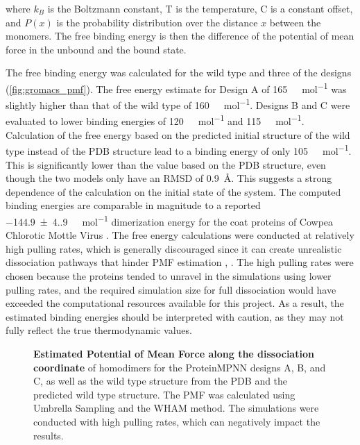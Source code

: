 where $k_B$ is the Boltzmann constant, T is the temperature, C is a constant offset, and $P(x)$ is the probability distribution over the distance $x$ between the monomers. The free binding energy is then the difference of the potential of mean force in the unbound and the bound state. 

The free binding energy was calculated for the wild type and three of the designs (\autoref{fig:gromacs_pmf}). The free energy estimate for Design A of \SI{165}{\kilo\cal\per\mole} was slightly higher than that of the wild type of \SI{160}{\kilo\cal\per\mole}. Designs B and C were evaluated to lower binding energies of \SI{120}{\kilo\cal\per\mole} and \SI{115}{\kilo\cal\per\mole}. Calculation of the free energy based on the predicted initial structure of the wild type instead of the PDB structure lead to a binding energy of only \SI{105}{\kilo\cal\per\mole}. This is significantly lower than the value based on the PDB structure, even though the two models only have an RMSD of \SI{0.9}{\angstrom}. This suggests a strong dependence of the calculation on the initial state of the system. The computed binding energies are comparable in magnitude to a reported \SI[separate-uncertainty=true]{-144.9(4.9)}{\kilo\cal\per\mole} dimerization energy for the coat proteins of Cowpea Chlorotic Mottle Virus \cite{ccmv_binding_energy}. The free energy calculations were conducted at relatively high pulling rates, which is generally discouraged since it can create unrealistic dissociation pathways that hinder PMF estimation \cite{lemkul_umbrella_sampling}, \cite{umbrella_sampling_problems}. The high pulling rates were chosen because the proteins tended to unravel in the simulations using lower pulling rates, and the required simulation size for full dissociation would have exceeded the computational resources available for this project. As a result, the estimated binding energies should be interpreted with caution, as they may not fully reflect the true thermodynamic values.

\begin{figure}
    
    \caption{\textbf{Estimated Potential of Mean Force along the dissociation coordinate} of homodimers for the ProteinMPNN designs A, B, and C, as well as the wild type structure from the PDB and the predicted wild type structure. The PMF was calculated using Umbrella Sampling and the WHAM method. The simulations were conducted with high pulling rates, which can negatively impact the results. }
    \label{fig:gromacs_pmf}
\end{figure}

